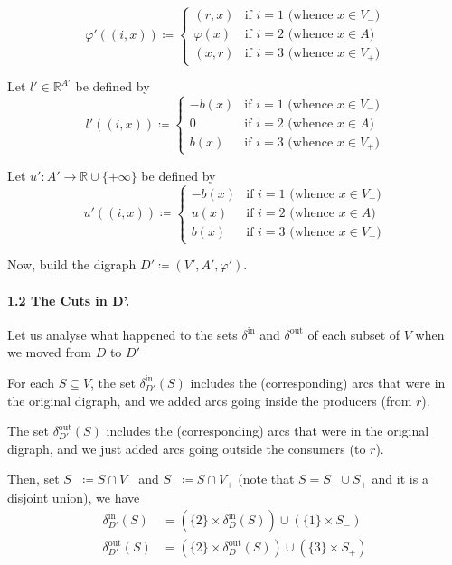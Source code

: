 \documentclass[a4paper,10pt, leqno]{article}
\theoremstyle{definition}
\begin{document}
$$
\varphi'((i, x)) \coloneqq
\left\{
	\begin{array}{ll}
		(r, x)  & \mbox{if } i = 1 \text{ (whence } x \in V_-)\\
		\varphi(x)  & \mbox{if } i = 2 \text{ (whence } x \in A) \\
		(x, r)  & \mbox{if } i = 3 \text{ (whence } x \in V_+)
	\end{array}
\right.
$$

Let $l' \in \mathbb{R}^{A'}$ be defined by
$$
l'((i, x)) \coloneqq
\left\{
	\begin{array}{ll}
		-b(x)  & \mbox{if } i = 1 \text{ (whence } x \in V_-) \\
		0  & \mbox{if } i = 2 \text{ (whence } x \in A) \\
		b(x)  & \mbox{if } i = 3 \text{ (whence } x \in V_+)
	\end{array}
\right.
$$

Let $u' : A' \to \mathbb{R} \cup \{+\infty\}$ be defined by
$$
u'((i, x)) \coloneqq
\left\{
	\begin{array}{ll}
		-b(x)  & \mbox{if } i = 1 \text{ (whence } x \in V_-) \\
		u(x)  & \mbox{if } i = 2 \text{ (whence } x \in A) \\
		b(x)  & \mbox{if } i = 3 \text{ (whence } x \in V_+)
	\end{array}
\right.
$$

Now, build the digraph $D' \coloneqq (V', A', \varphi')$. 

\paragraph{\textbf{1.2 The Cuts in D'.}}
Let us analyse what happened to the sets $\delta^{\text{in}}$ and $\delta^{\text{out}}$ of each subset of $V$ when we moved from $D$ to $D'$

For each $S \subseteq V$, the set $\delta_{D'}^{\text{in}}(S)$ includes the (corresponding) arcs that were in the original digraph, and we added arcs going inside the producers (from $r$). 

The set $\delta_{D'}^{\text{out}}(S)$ includes the (corresponding) arcs that were in the original digraph, and we just added arcs going outside the consumers (to $r$). 

Then, set $S_- \coloneqq S \cap V_-$ and $S_+ \coloneqq S \cap V_+$ (note that $S = S_- \cup S_+$ and it is a disjoint union), we have
\begin{align*}
\tag{1.1}
    \delta_{D'}^{\text{in}}(S) &= (\{2\}\times\delta_{D}^{\text{in}}(S)) \cup (\{1\} \times S_-) \\
\tag{1.2}
    \delta_{D'}^{\text{out}}(S) &= (\{2\}\times\delta_{D}^{\text{out}}(S)) \cup (\{3\} \times S_+)
\end{align*}
\end{document}

